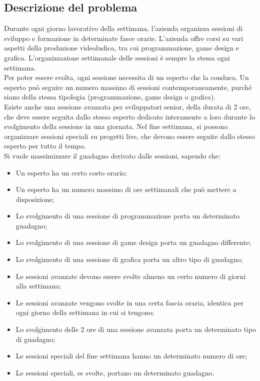 \documentclass[12pt]{article}
\begin{document}
    \subsection{Descrizione del problema}
    Durante ogni giorno lavorativo della settimana, l'azienda organizza sessioni di sviluppo e formazione in determinate fasce orarie. L'azienda offre corsi su vari aspetti della produzione videoludica, tra cui programmazione, game design e grafica. L'organizzazione settimanale delle sessioni è sempre la stessa ogni settimana.\\
    Per poter essere svolta, ogni sessione necessita di un esperto che la conduca. Un esperto può seguire un numero massimo di sessioni contemporaneamente, purché siano della stessa tipologia (programmazione, game design o grafica).\\
    Esiste anche una sessione avanzata per sviluppatori senior, della durata di 2 ore, che deve essere seguita dallo stesso esperto dedicato interamente a loro durante lo svolgimento della sessione in una giornata. Nel fine settimana, si possono organizzare sessioni speciali su progetti live, che devono essere seguite dallo stesso esperto per tutto il tempo.\\
    Si vuole massimizzare il guadagno derivato dalle sessioni, sapendo che:
    \begin{itemize}
        \item Un esperto ha un certo costo orario;
        \item Un esperto ha un numero massimo di ore settimanali che può mettere a disposizione;
        \item Lo svolgimento di una sessione di programmazione porta un determinato guadagno;
        \item Lo svolgimento di una sessione di game design porta un guadagno differente;
        \item Lo svolgimento di una sessione di grafica porta un altro tipo di guadagno;
        \item Le sessioni avanzate devono essere svolte almeno un certo numero di giorni alla settimana;
        \item Le sessioni avanzate vengono svolte in una certa fascia oraria, identica per ogni giorno della settimana in cui si tengono;
        \item Lo svolgimento delle 2 ore di una sessione avanzata porta un determinato tipo di guadagno;
        \item Le sessioni speciali del fine settimana hanno un determinato numero di ore;
        \item Le sessioni speciali, se svolte, portano un determinato guadagno.
    \end{itemize}
\end{document}
